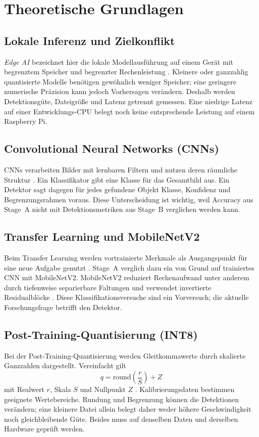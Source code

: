 \section{Theoretische Grundlagen}

\subsection{Lokale Inferenz und Zielkonflikt}
\emph{Edge AI} bezeichnet hier die lokale Modellausführung auf einem Gerät mit begrenztem Speicher und begrenzter Rechenleistung \cite{deng2020model,wang2020survey}. Kleinere oder ganzzahlig quantisierte Modelle benötigen gewöhnlich weniger Speicher; eine geringere numerische Präzision kann jedoch Vorhersagen verändern. Deshalb werden Detektionsgüte, Dateigröße und Latenz getrennt gemessen. Eine niedrige Latenz auf einer Entwicklungs-CPU belegt noch keine entsprechende Leistung auf einem Raspberry Pi.

\subsection{Convolutional Neural Networks (CNNs)}
CNNs verarbeiten Bilder mit lernbaren Filtern und nutzen deren räumliche Struktur \cite{lecun2015deep,bengio2013representation}. Ein Klassifikator gibt eine Klasse für das Gesamtbild aus. Ein Detektor sagt dagegen für jedes gefundene Objekt Klasse, Konfidenz und Begrenzungsrahmen voraus. Diese Unterscheidung ist wichtig, weil Accuracy aus Stage~A nicht mit Detektionsmetriken aus Stage~B verglichen werden kann.

\subsection{Transfer Learning und MobileNetV2}
Beim Transfer Learning werden vortrainierte Merkmale als Ausgangspunkt für eine neue Aufgabe genutzt \cite{yosinski2014transferable}. Stage~A verglich dazu ein von Grund auf trainiertes CNN mit MobileNetV2. MobileNetV2 reduziert Rechenaufwand unter anderem durch tiefenweise separierbare Faltungen und verwendet invertierte Residualblöcke \cite{sandler2018mobilenetv2}. Diese Klassifikationsversuche sind ein Vorversuch; die aktuelle Forschungsfrage betrifft den Detektor.

\subsection{Post-Training-Quantisierung (INT8)}
Bei der Post-Training-Quantisierung werden Gleitkommawerte durch skalierte Ganzzahlen dargestellt. Vereinfacht gilt
\begin{equation}
q = \mathrm{round}\left(\frac{r}{S}\right) + Z
\end{equation}
mit Realwert $r$, Skala $S$ und Nullpunkt $Z$ \cite{krishnamoorthi2018quantizing}. Kalibrierungsdaten bestimmen geeignete Wertebereiche. Rundung und Begrenzung können die Detektionen verändern; eine kleinere Datei allein belegt daher weder höhere Geschwindigkeit noch gleichbleibende Güte. Beides muss auf denselben Daten und derselben Hardware geprüft werden.

